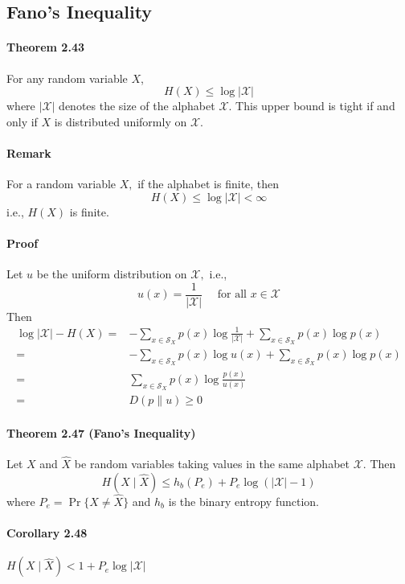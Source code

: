\documentclass[8pt]{article}
\begin{document}
\newpage
\subsection{Fano's Inequality}
\begin{tcolorbox}
\paragraph{Theorem 2.43} For any random variable $X$,
$$
H(X) \leq \log |\mathcal{X}|
$$
where $|\mathcal{X}|$ denotes the size of the alphabet $\mathcal{X}$. This upper bound is tight if and only if $X$ is distributed uniformly on $\mathcal{X}$.
\end{tcolorbox}

\paragraph{Remark} For a random variable $X,$ if the alphabet is finite, then
$$
H(X) \leq \log |\mathcal{X}|<\infty
$$
i.e., $H(X)$ is finite.

\paragraph{Proof} Let $u$ be the uniform distribution on $\mathcal{X},$ i.e.,
$$
u(x)=\frac{1}{|\mathcal{X}|} \quad \text { for all } x \in \mathcal{X}
$$
Then
$$
\begin{aligned}
\log |\mathcal{X}|-H(X) =&-\sum_{x \in \mathcal{S}_{X}} p(x) \log \frac{1}{|\mathcal{X}|}+\sum_{x \in \mathcal{S}_{X}} p(x) \log p(x) \\
=&-\sum_{x \in \mathcal{S}_{X}} p(x) \log u(x)+\sum_{x \in \mathcal{S}_{X}} p(x) \log p(x) \\
=& \sum_{x \in \mathcal{S}_{X}} p(x) \log \frac{p(x)}{u(x)} \\
=& D(p \| u) \geq 0
\end{aligned}
$$

\begin{tcolorbox}
\paragraph{Theorem 2.47 (Fano's Inequality)} Let $X$ and $\hat{X}$ be random variables taking values in the same alphabet $\mathcal{X}$. Then
$$
H(X \mid \hat{X}) \leq h_{b}\left(P_{e}\right)+P_{e} \log (|\mathcal{X}|-1)
$$
where $P_{e}=\operatorname{Pr}\{X \neq \hat{X}\}$ and $h_{b}$ is the binary entropy function.
\\
\paragraph{Corollary 2.48}
$H(X \mid \hat{X})< 1 +P_{e} \log |\mathcal{X}|$
\end{tcolorbox}
\end{document}
